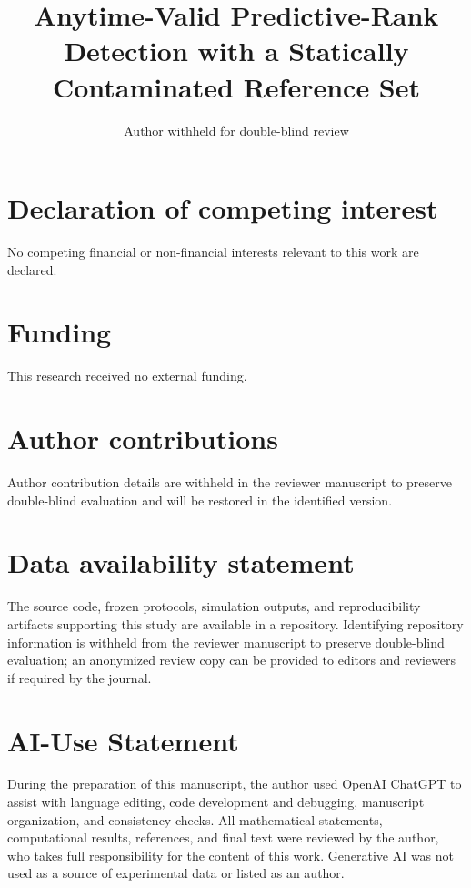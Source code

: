 \documentclass{packages/redina}
\title{Anytime-Valid Predictive-Rank Detection with a Statically Contaminated Reference Set}
\author[1]{Author withheld for double-blind review}
\affil[1]{Affiliation withheld for double-blind review}
\date{}
\begin{document}
\maketitle










\section{Declaration of competing interest}
No competing financial or non-financial interests relevant to this work are declared.

\section{Funding}
This research received no external funding.

\section{Author contributions}
Author contribution details are withheld in the reviewer manuscript to preserve double-blind evaluation and will be restored in the identified version.

\section{Data availability statement}
The source code, frozen protocols, simulation outputs, and reproducibility artifacts supporting this study are available in a repository. Identifying repository information is withheld from the reviewer manuscript to preserve double-blind evaluation; an anonymized review copy can be provided to editors and reviewers if required by the journal.

\section{AI-Use Statement}
During the preparation of this manuscript, the author used OpenAI ChatGPT to assist with language editing, code development and debugging, manuscript organization, and consistency checks. All mathematical statements, computational results, references, and final text were reviewed by the author, who takes full responsibility for the content of this work. Generative AI was not used as a source of experimental data or listed as an author.



\end{document}
